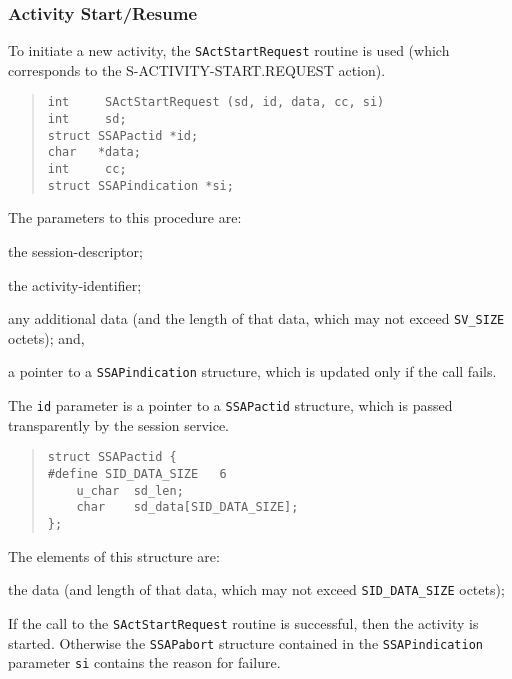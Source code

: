 \subsubsection	{Activity Start/Resume}
To initiate a new activity,
the \verb"SActStartRequest" routine is used
(which corresponds to the {\sf S-ACTIVITY-START.REQUEST\/} action).
\begin{quote}\small\begin{verbatim}
int     SActStartRequest (sd, id, data, cc, si)
int     sd;
struct SSAPactid *id;
char   *data;
int     cc;
struct SSAPindication *si;
\end{verbatim}\end{quote}
The parameters to this procedure are:
\begin{describe}
\item[\verb"sd":] the session-descriptor;

\item[\verb"id":] the activity-identifier;

\item[\verb"data"/\verb"cc":] any additional data
(and the length of that data, which may not exceed \verb"SV_SIZE" octets);
and,

\item[\verb"si":] a pointer to a \verb"SSAPindication" structure, which is
updated only if the call fails.
\end{describe}

The \verb"id" parameter is a pointer to a \verb"SSAPactid" structure,
which is passed transparently by the session service.
\begin{quote}\small\begin{verbatim}
struct SSAPactid {
#define SID_DATA_SIZE   6
    u_char  sd_len;
    char    sd_data[SID_DATA_SIZE];
};
\end{verbatim}\end{quote}
The elements of this structure are:\label{SSAPactid}
\begin{describe}
\item[\verb"sd\_data"/\verb"sd\_len":] the data
(and length of that data, which may not exceed \verb"SID_DATA_SIZE" octets);
\end{describe}
If the call to the \verb"SActStartRequest" routine is successful,
then the activity is started.
Otherwise the \verb"SSAPabort" structure contained in
the \verb"SSAPindication" parameter
\verb"si" contains the reason for failure.

